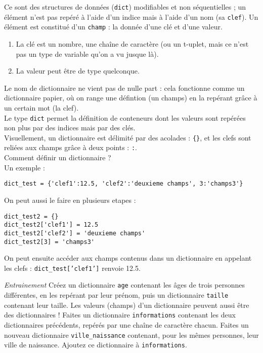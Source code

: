 

Ce sont des structures de données (\texttt{dict}) modifiables et non séquentielles ; un élément n'est pas repéré à l'aide d'un indice mais à l'aide d'un nom (sa \texttt{clef}). Un élément est constitué d'un \texttt{champ} : la donnée d'une clé et d'une valeur.
\begin{enumerate}
	\item La clé est un nombre, une chaîne de caractère (ou un t-uplet, mais ce n'est pas un type de variable qu'on a vu jusque là).
	\item La valeur peut être de type quelconque.
\end{enumerate}
Le nom de dictionnaire ne vient pas de nulle part : cela fonctionne comme un dictionnaire papier, où on range une défintion (un champs) en la repérant grâce à un certain mot (la clef).\\
Le type \texttt{dict} permet la définition de conteneurs dont les valeurs sont repérées non plus par des indices mais par des clés. \\

Visuellement, un dictionnaire est délimité par des acolades : \texttt{\{\}}, et les clefs sont reliées aux champs grâce à deux points : \texttt{:}.\\

Comment définir un dictionnaire ?\\
Un exemple :
\begin{verbatim}
dict_test = {'clef1':12.5, 'clef2':'deuxieme champs', 3:'champs3'}
\end{verbatim}
On peut aussi le faire en plusieurs etapes :
\begin{verbatim}
dict_test2 = {}
dict_test2['clef1'] = 12.5
dict_test2['clef2'] = 'deuxieme champs'
dict_test2[3] = 'champs3'
\end{verbatim}

On peut ensuite accéder aux champs contenus dans un dictionnaire en appelant les clefs : \texttt{dict_test['clef1']} renvoie 12.5.

\exo
\textit{Entrainement}
\quessques Créez un dictionnaire \texttt{age} contenant les âges de trois personnes différentes, en les repérant par leur prénom, puis un dictionnaire \texttt{taille} contenant leur taille.
\ssques Les valeurs (champs) d'un dictionnaire peuvent aussi être des dictionnaires ! Faites un dictionnaire \texttt{informations} contenant les deux dictionnaires précédents, repérés par une chaîne de caractère chacun.
\ssques Faites un nouveau dictionnaire \texttt{ville\_naissance} contenant, pour les mêmes personnes, leur ville de naissance. Ajoutez ce dictionnaire à \texttt{informations}.

